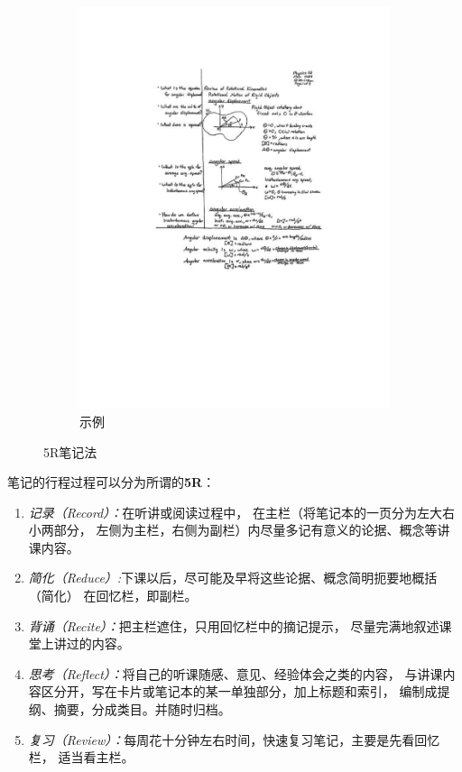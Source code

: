 \begin{figure}[h]
\begin{subfigure}[t]{0.45\textwidth}
		\includegraphics[width=\textwidth]{./images/Ch00/Cornell-NTS/exCNTS.pdf}
		\caption{示例}\label{fig:5R-2}
	\end{subfigure}
	\caption{5R笔记法}\label{fig:5R}
\end{figure}
	
笔记的行程过程可以分为所谓的{\bf 5R}：

\begin{enumerate}[Step1]
  \setlength{\itemindent}{1cm}
  \setlength{\topsep}{0pt}
  \item {\it 记录（Record）：}在听讲或阅读过程中，
  在主栏（将笔记本的一页分为左大右小两部分，
  左侧为主栏，右侧为副栏）内尽量多记有意义的论据、概念等讲课内容。
  \item {\it 简化（Reduce）:}下课以后，尽可能及早将这些论据、概念简明扼要地概括（简化）
  在回忆栏，即副栏。
  \item {\it 背诵（Recite）：}把主栏遮住，只用回忆栏中的摘记提示，
  尽量完满地叙述课堂上讲过的内容。
  \item {\it 思考（Reflect）：}将自己的听课随感、意见、经验体会之类的内容，
  与讲课内容区分开，写在卡片或笔记本的某一单独部分，加上标题和索引，
  编制成提纲、摘要，分成类目。并随时归档。
  \item {\it 复习（Review）：}每周花十分钟左右时间，快速复习笔记，主要是先看回忆栏，
  适当看主栏。
\end{enumerate}

